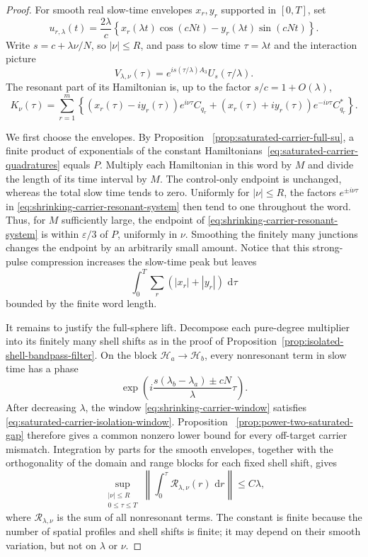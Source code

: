 \documentclass[11pt]{article}
\theoremstyle{remark}
\newcommand{\dd}{\,\mathrm d}
\begin{document}
\begin{proof}
For smooth real slow-time envelopes $x_r,y_r$ supported in $[0,T]$, set
\begin{equation}
 u_{r,\lambda}(t)=
 \frac{2\lambda}{c}
 \left\{
 x_r(\lambda t)\cos(cNt)
 -y_r(\lambda t)\sin(cNt)
 \right\}.
 \label{eq:shrinking-carrier-control}
\end{equation}
Write $s=c+\lambda\nu/N$, so $|\nu|\leq R$, and pass to slow time
$\tau=\lambda t$ and the interaction picture
\[
 V_{\lambda,\nu}(\tau)=
 e^{is(\tau/\lambda)A_3}U_s(\tau/\lambda).
\]
The resonant part of its Hamiltonian is, up to the factor
$s/c=1+O(\lambda)$,
\begin{equation}
 K_\nu(\tau)=
 \sum_{r=1}^m
 \left\{
 (x_r(\tau)-iy_r(\tau))e^{i\nu\tau}C_{q_r}
 +(x_r(\tau)+iy_r(\tau))e^{-i\nu\tau}C_{q_r}^\ast
 \right\}.
 \label{eq:shrinking-carrier-resonant-system}
\end{equation}

We first choose the envelopes.  By Proposition
~\ref{prop:saturated-carrier-full-su}, a finite product of exponentials of
the constant Hamiltonians~\eqref{eq:saturated-carrier-quadratures} equals
$P$.  Multiply each Hamiltonian in this word by $M$ and divide the length
of its time interval by $M$.  The control-only endpoint is unchanged,
whereas the total slow time tends to zero.  Uniformly for $|\nu|\leq R$,
the factors $e^{\pm i\nu\tau}$ in
\eqref{eq:shrinking-carrier-resonant-system} then tend to one throughout the
word.  Thus, for $M$ sufficiently large, the endpoint of
\eqref{eq:shrinking-carrier-resonant-system} is within
$\varepsilon/3$ of $P$, uniformly in $\nu$.  Smoothing the finitely many
junctions changes the endpoint by an arbitrarily small amount.  Notice that
this strong-pulse compression increases the slow-time peak but leaves
\[
 \int_0^T\sum_r(|x_r|+|y_r|)\,\dd\tau
 \]
bounded by the finite word length.

It remains to justify the full-sphere lift.  Decompose each pure-degree
multiplier into its finitely many shell shifts as in the proof of
Proposition~\ref{prop:isolated-shell-bandpass-filter}.  On the block
$\mathcal H_a\to\mathcal H_b$, every nonresonant term in slow time has a
phase
\[
 \exp\!\left(
  i\frac{s(\lambda_b-\lambda_a)\pm cN}{\lambda}\tau
 \right).
\]
After decreasing $\lambda$, the window
\eqref{eq:shrinking-carrier-window} satisfies
\eqref{eq:saturated-carrier-isolation-window}.  Proposition
~\ref{prop:power-two-saturated-gap} therefore gives a common nonzero lower
bound for every off-target carrier mismatch.  Integration by parts for the
smooth envelopes, together with the orthogonality of the domain and range
blocks for each fixed shell shift, gives
\begin{equation}
 \sup_{\substack{|\nu|\leq R\\0\leq\tau\leq T}}
 \left\|
  \int_0^\tau\mathcal R_{\lambda,\nu}(r)\,\dd r
 \right\|
 \leq C\lambda ,
 \label{eq:shrinking-carrier-remainder-primitive}
\end{equation}
where $\mathcal R_{\lambda,\nu}$ is the sum of all nonresonant terms.
The constant is finite because the number of spatial profiles and shell
shifts is finite; it may depend on their smooth variation, but not on
$\lambda$ or $\nu$.


\end{proof}
\end{document}
